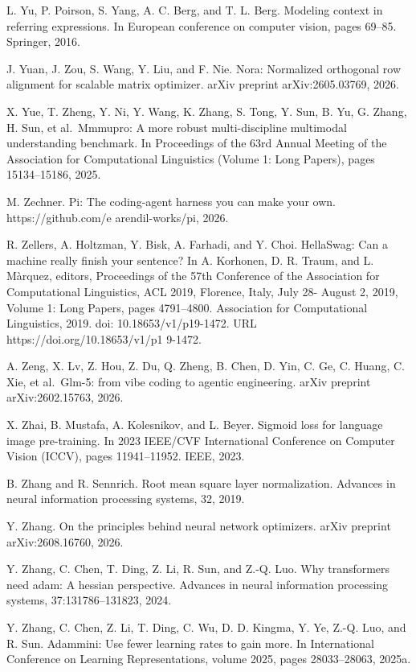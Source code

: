 \documentclass[
  10
]{article}
\begin{document}
L. Yu, P. Poirson, S. Yang, A. C. Berg, and T. L. Berg. Modeling context
in referring expressions. In European conference on computer vision,
pages 69--85. Springer, 2016.

J. Yuan, J. Zou, S. Wang, Y. Liu, and F. Nie. Nora: Normalized
orthogonal row alignment for scalable matrix optimizer. arXiv preprint
arXiv:2605.03769, 2026.

X. Yue, T. Zheng, Y. Ni, Y. Wang, K. Zhang, S. Tong, Y. Sun, B. Yu, G.
Zhang, H. Sun, et al.~Mmmupro: A more robust multi-discipline multimodal
understanding benchmark. In Proceedings of the 63rd Annual Meeting of
the Association for Computational Linguistics (Volume 1: Long Papers),
pages 15134--15186, 2025.

M. Zechner. Pi: The coding-agent harness you can make your own.
https://github.com/e arendil-works/pi, 2026.

R. Zellers, A. Holtzman, Y. Bisk, A. Farhadi, and Y. Choi. HellaSwag:
Can a machine really finish your sentence? In A. Korhonen, D. R. Traum,
and L. Màrquez, editors, Proceedings of the 57th Conference of the
Association for Computational Linguistics, ACL 2019, Florence, Italy,
July 28- August 2, 2019, Volume 1: Long Papers, pages 4791--4800.
Association for Computational Linguistics, 2019. doi:
10.18653/v1/p19-1472. URL https://doi.org/10.18653/v1/p1 9-1472.

A. Zeng, X. Lv, Z. Hou, Z. Du, Q. Zheng, B. Chen, D. Yin, C. Ge, C.
Huang, C. Xie, et al.~Glm-5: from vibe coding to agentic engineering.
arXiv preprint arXiv:2602.15763, 2026.

X. Zhai, B. Mustafa, A. Kolesnikov, and L. Beyer. Sigmoid loss for
language image pre-training. In 2023 IEEE/CVF International Conference
on Computer Vision (ICCV), pages 11941--11952. IEEE, 2023.

B. Zhang and R. Sennrich. Root mean square layer normalization. Advances
in neural information processing systems, 32, 2019.

Y. Zhang. On the principles behind neural network optimizers. arXiv
preprint arXiv:2608.16760, 2026.

Y. Zhang, C. Chen, T. Ding, Z. Li, R. Sun, and Z.-Q. Luo. Why
transformers need adam: A hessian perspective. Advances in neural
information processing systems, 37:131786--131823, 2024.

Y. Zhang, C. Chen, Z. Li, T. Ding, C. Wu, D. D. Kingma, Y. Ye, Z.-Q.
Luo, and R. Sun. Adammini: Use fewer learning rates to gain more. In
International Conference on Learning Representations, volume 2025, pages
28033--28063, 2025a.
\end{document}

